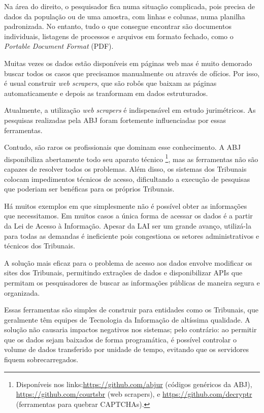 \documentclass[]{report}
\begin{document}
Na área do direito, o pesquisador fica numa situação complicada, pois
precisa de dados da população ou de uma amostra, com linhas e colunas,
numa planilha padronizada. No entanto, tudo o que consegue encontrar são
documentos individuais, listagens de processos e arquivos em formato
fechado, como o \emph{Portable Document Format} (PDF).

Muitas vezes os dados estão disponíveis em páginas web mas é muito
demorado buscar todos os casos que precisamos manualmente ou através de
ofícios. Por isso, é usual construir \emph{web scrapers}, que são robôs
que baixam as páginas automaticamente e depois as tranformam em dados
estruturados.

Atualmente, a utilização \emph{web scrapers} é indispensável em estudo
jurimétricos. As pesquisas realizadas pela ABJ foram fortemente
influenciadas por essas ferramentas.

Contudo, são raros os profissionais que dominam esse conhecimento. A ABJ
disponibiliza abertamente todo seu aparato técnico \footnote{Disponíveis
  nos links:\url{https://github.com/abjur} (códigos genéricos da ABJ),
  \url{https://github.com/courtsbr} (web scrapers), e
  \url{https://github.com/decryptr} (ferramentas para quebrar CAPTCHAs).},
mas as ferramentas não são capazes de resolver todos os problemas. Além
disso, os sistemas dos Tribunais colocam impedimentos técnicos de
acesso, dificultando a execução de pesquisas que poderiam ser benéficas
para os próprios Tribunais.

Há muitos exemplos em que simplesmente não é possível obter as
informações que necessitamos. Em muitos casos a única forma de acessar
os dados é a partir da Lei de Acesso à Informação. Apesar da LAI ser um
grande avanço, utilizá-la para todas as demandas é ineficiente pois
congestiona os setores administrativos e técnicos dos Tribunais.

A solução mais eficaz para o problema de acesso aos dados envolve
modificar os sites dos Tribunais, permitindo extrações de dados e
disponibilizar APIs que permitam os pesquisadores de buscar as
informações públicas de maneira segura e organizada.

Essas ferramentas são simples de construir para entidades como os
Tribunais, que geralmente têm equipes de Tecnologia da Informação de
altíssima qualidade. A solução não causaria impactos negativos nos
sistemas; pelo contrário: ao permitir que os dados sejam baixados de
forma programática, é possível controlar o volume de dados transferido
por unidade de tempo, evitando que os servidores fiquem sobrecarregados.
\end{document}
